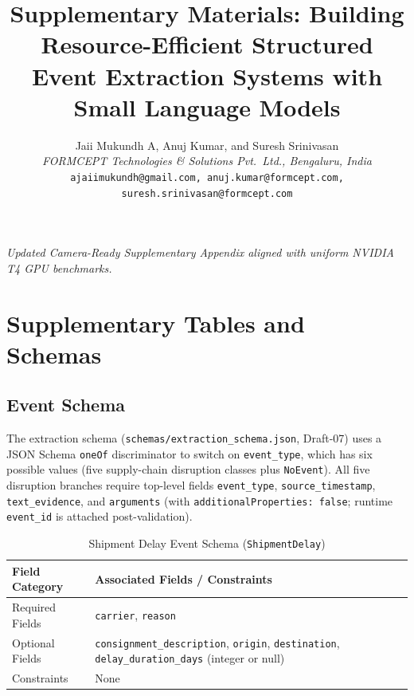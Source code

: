 \documentclass[11pt,a4paper]{article}
\title{\textbf{Supplementary Materials: Building Resource-Efficient Structured Event Extraction Systems with Small Language Models}}
\author{Jaii Mukundh A, Anuj Kumar, and Suresh Srinivasan\\
\textit{FORMCEPT Technologies \& Solutions Pvt.\ Ltd., Bengaluru, India}\\
\texttt{ajaiimukundh@gmail.com, anuj.kumar@formcept.com, suresh.srinivasan@formcept.com}}
\date{}
\begin{document}
\maketitle
\thispagestyle{plain}

\begin{center}
\small\textit{Updated Camera-Ready Supplementary Appendix aligned with uniform NVIDIA T4 GPU benchmarks.}
\end{center}

\tableofcontents
\newpage

\section{Supplementary Tables and Schemas}

\subsection{Event Schema}
The extraction schema (\texttt{schemas/extraction\_schema.json}, Draft-07) uses a JSON Schema \texttt{oneOf} discriminator to switch on \texttt{event\_type}, which has six possible values (five supply-chain disruption classes plus \texttt{NoEvent}). All five disruption branches require top-level fields \texttt{event\_type}, \texttt{source\_timestamp}, \texttt{text\_evidence}, and \texttt{arguments} (with \texttt{additionalProperties: false}; runtime \texttt{event\_id} is attached post-validation).

\begin{table}[htbp]
\centering
\caption{Shipment Delay Event Schema (\texttt{ShipmentDelay})}
\label{tab:schema_shipment_delay}
\begin{tabular}{@{}p{3.0cm} p{9.5cm}@{}}
\toprule
\textbf{Field Category} & \textbf{Associated Fields / Constraints} \\
\midrule
Required Fields & \texttt{carrier}, \texttt{reason} \\
Optional Fields & \texttt{consignment\_description}, \texttt{origin}, \texttt{destination}, \texttt{delay\_duration\_days} (integer or null) \\
Constraints & None \\
\bottomrule
\end{tabular}
\end{table}
\end{document}
